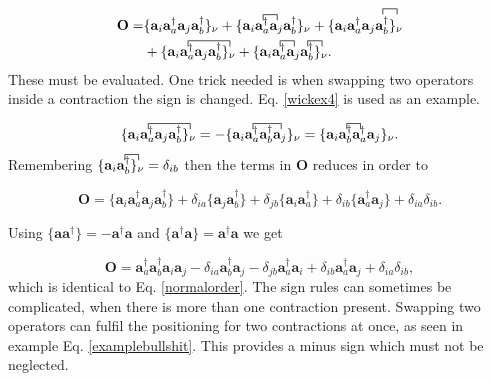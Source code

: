 \documentclass[a4paper,norsk,11pt,twoside]{report}
\begin{document}
\begin{align}
\textbf{O} = & 
\{
\textbf{a}_i \textbf{a}^{\dag}_a \textbf{a}_j \textbf{a}^{\dag}_b
\}_{\nu}
+ \{
\contraction{}{\textbf{a}_i}{}{\textbf{a}^{\dag}_a}
\textbf{a}_i \textbf{a}^{\dag}_a
\textbf{a}_j \textbf{a}^{\dag}_b
\}_{\nu}
+ \{
\textbf{a}_i \textbf{a}^{\dag}_a
\contraction{}{\textbf{a}^j}{}{\textbf{a}^{\dag}_b}
\textbf{a}_j \textbf{a}^{\dag}_b
\}_{\nu} \nonumber \\ &
+ \{
\contraction{}{\textbf{a}_i}{\textbf{a}^{\dag}_a \textbf{a}_j}{\textbf{a}^{\dag}_b}
\textbf{a}_i \textbf{a}^{\dag}_a \textbf{a}_j \textbf{a}^{\dag}_b
\}_{\nu}
+ \{
\contraction{}{\textbf{a}_i}{}{\textbf{a}^{\dag}_a}
\textbf{a}_i \textbf{a}^{\dag}_a 
\contraction{}{\textbf{a}_j}{}{\textbf{a}^{\dag}_b}
\textbf{a}_j \textbf{a}^{\dag}_b
\}_{\nu} .
\end{align}
These must be evaluated. One trick needed is when swapping two operators inside a contraction the sign is changed. Eq. \eqref{wickex4} is used as an example.

\begin{equation}
\{
\contraction{}{\textbf{a}_i}{\textbf{a}^{\dag}_a \textbf{a}_j}{\textbf{a}^{\dag}_b}
\textbf{a}_i \textbf{a}^{\dag}_a \textbf{a}_j \textbf{a}^{\dag}_b
\}_{\nu}
= - \{
\contraction{}{\textbf{a}_i}{\textbf{a}^{\dag}_a}{\textbf{a}^{\dag}_b}
\textbf{a}_i \textbf{a}^{\dag}_a \textbf{a}^{\dag}_b 
\textbf{a}_j 
\}_{\nu}
= \{
\contraction{}{\textbf{a}_i}{}{\textbf{a}^{\dag}_b}
\textbf{a}_i  \textbf{a}^{\dag}_b 
\textbf{a}^{\dag}_a \textbf{a}_j 
\}_{\nu} . \label{wikssign}
\end{equation}
Remembering $\{\contraction{}{\textbf{a}_i}{}{\textbf{a}^{\dag}_b}
\textbf{a}_i  \textbf{a}^{\dag}_b \}_{\nu} = \delta_{ib}$ then the terms in $\textbf{O}$ reduces in order to

\begin{equation}
\textbf{O} =  \{ 
\textbf{a}_i \textbf{a}^{\dag}_a
\textbf{a}_j \textbf{a}^{\dag}_b
\} +
\delta_{ia} \{
\textbf{a}_j \textbf{a}^{\dag}_b
\} +
\delta_{jb} \{
\textbf{a}_i \textbf{a}^{\dag}_a
\} +
\delta_{ib} \{
\textbf{a}^{\dag}_a \textbf{a}_j
\} +
\delta_{ia} \delta_{ib} . 
\end{equation}

Using $\{
\textbf{a} \textbf{a}^{\dag}
\} = -\textbf{a}^{\dag} \textbf{a}$ and $\{
\textbf{a}^{\dag} \textbf{a} 
\} = \textbf{a}^{\dag} \textbf{a}$ we get

\begin{equation}
\textbf{O} = 
\textbf{a}^{\dag}_a \textbf{a}^{\dag}_b
\textbf{a}_i \textbf{a}_j  
- \delta_{ia} \textbf{a}^{\dag}_b \textbf{a}_j
- \delta_{jb} \textbf{a}^{\dag}_a \textbf{a}_i
+ \delta_{ib} \textbf{a}^{\dag}_a \textbf{a}_j 
+ \delta_{ia} \delta_{ib} ,
\end{equation}
which is identical to Eq. \eqref{normalorder}. The sign rules can sometimes be complicated, when there is more than one contraction present. Swapping two operators can fulfil the positioning for two contractions at once, as seen in example Eq. \eqref{examplebullshit}. This provides a minus sign which must not be neglected.
\end{document}
